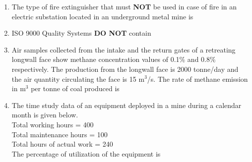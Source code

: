 \documentclass[journal]{IEEEtran}
\begin{document}
\begin{enumerate}
\item The type of fire extinguisher that must \textbf{NOT} be used in case of fire in an electric substation located in an underground metal mine is
\begin{enumerate}
\end{enumerate}

\item ISO 9000 Quality Systems \textbf{DO NOT} contain
\begin{enumerate}
\end{enumerate}

\item Air samples collected from the intake and the return gates of a retreating longwall face show methane concentration values of 0.1\% and 0.8\% respectively. The production from the longwall face is 2000 tonne/day and the air quantity circulating the face is 15 m$^3$/s. The rate of methane emission in m$^3$ per tonne of coal produced is
\begin{enumerate}
\end{enumerate}

\item The time study data of an equipment deployed in a mine during a calendar month is given below.\\
Total working hours = 400\\
Total maintenance hours = 100\\
Total hours of actual work = 240\\
The percentage of utilization of the equipment is
\begin{enumerate}
\end{enumerate}


\end{enumerate}
\end{document}

